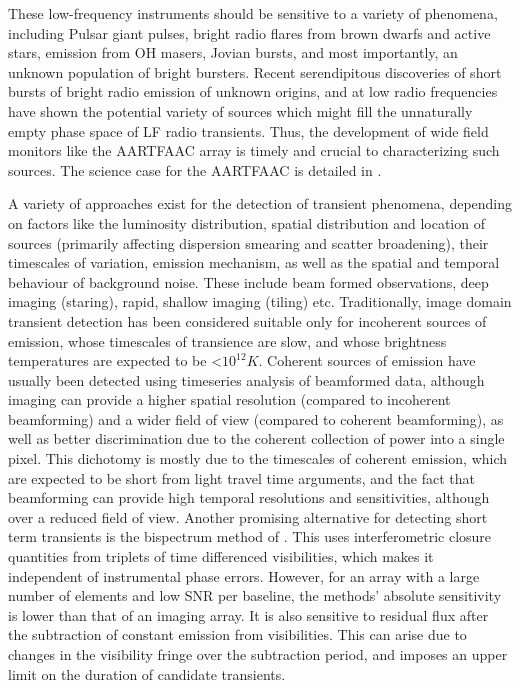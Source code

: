\documentclass{aa}
\begin{document}
These low-frequency instruments  should be sensitive to a  variety of phenomena,
including Pulsar giant pulses, bright  radio flares from brown dwarfs and active
stars, emission from OH masers,  Jovian bursts, and most importantly, an unknown
population of bright bursters.  Recent serendipitous discoveries of short bursts
of  bright radio  emission  of unknown  origins,  and at  low radio  frequencies
\citep{lorimer2007bright,  thornton2013population}   have  shown  the  potential
variety of  sources which  might fill  the unnaturally empty  phase space  of LF
radio transients. Thus, the development of wide field monitors like the AARTFAAC
array is timely and crucial to characterizing such sources. The science case for
the AARTFAAC is detailed in \citep{wijers2013aartfaac}.

A  variety  of  approaches  exist  for the  detection  of  transient  phenomena,
depending on factors like  the luminosity distribution, spatial distribution and
location  of  sources  (primarily  affecting  dispersion  smearing  and  scatter
broadening), their timescales  of variation, emission mechanism, as  well as the
spatial and temporal  behaviour of background noise.  These  include beam formed
observations,  deep  imaging (staring),  rapid,  shallow  imaging (tiling)  etc.
Traditionally,  image domain  transient detection  has been  considered suitable
only  for incoherent  sources of  emission, whose  timescales of  transience are
slow,  and  whose  brightness  temperatures  are  expected  to  be  <$10^{12}K$.
Coherent  sources  of  emission  have  usually been  detected  using  timeseries
analysis  of beamformed  data, although  imaging  can provide  a higher  spatial
resolution  (compared to  incoherent  beamforming)  and a  wider  field of  view
(compared to coherent beamforming), as  well as better discrimination due to the
coherent collection of power into a  single pixel.  This dichotomy is mostly due
to the  timescales of  coherent emission,  which are expected  to be  short from
light  travel time arguments,  and the  fact that  beamforming can  provide high
temporal resolutions and  sensitivities, although over a reduced  field of view.
Another  promising  alternative  for  detecting  short term  transients  is  the
bispectrum  method  of \citep{law2012all}.   This  uses interferometric  closure
quantities  from  triplets of  time  differenced  visibilities,  which makes  it
independent of  instrumental phase errors.  However,  for an array  with a large
number of elements  and low SNR per baseline,  the methods' absolute sensitivity
is lower than that  of an imaging array.  It is also  sensitive to residual flux
after the  subtraction of constant  emission from visibilities.  This  can arise
due to changes in the visibility fringe over the subtraction period, and imposes
an upper limit  on the duration of candidate transients. 
\end{document}
